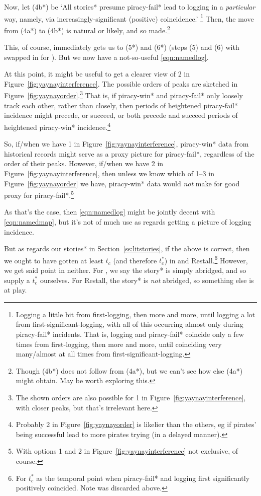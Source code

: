 		Now, let (4b*) be `All stories* presume piracy-fail* lead to logging in a \emph{particular} way, namely, via increasingly-significant (positive) coincidence.'%
		\footnote{Logging a little bit from first-logging, then more and more, until logging a lot from first-significant-logging, with all of this occurring almost only during piracy-fail* incidents. That is, logging and piracy-fail* coincide only a few times from first-logging, then more and more, until coinciding very many/almost at all times from first-significant-logging.}
		Then, the move from (4a*) to (4b*) is natural or likely, and so made.\footnote{Though (4b*) does not follow from (4a*), but we can't see how else (4a*) might obtain. May be worth exploring this.}
		
		This, of course, immediately gets us to (5*) and (6*) (steps (5) and (6) with  swapped in for ). But we now have a not-so-useful \ref{eqn:namedlog}.
		
		At this point, it might be useful to get a clearer view of 2 in Figure~\ref{fig:yaynayinterference}. The possible orders of peaks are sketched in Figure~\ref{fig:yaynayorder}.\footnote{The shown orders are also possible for 1 in Figure~\ref{fig:yaynayinterference}, with closer peaks, but that's irrelevant here.} That is, if piracy-win* and piracy-fail* only loosely track each other, rather than closely, then periods of heightened piracy-fail* incidence might precede, or succeed, or both precede and succeed periods of heightened piracy-win* incidence.\footnote{Probably 2 in Figure~\ref{fig:yaynayorder} is likelier than the others, eg if pirates' being successful lead to more pirates trying (in a delayed manner).}
		
		So, if/when we have 1 in Figure~\ref{fig:yaynayinterference}, piracy-win* data from historical records might serve as a proxy picture for piracy-fail*, regardless of the order of their peaks. However, if/when we have 2 in Figure~\ref{fig:yaynayinterference}, then unless we know which of 1--3 in Figure~\ref{fig:yaynayorder} we have, piracy-win* data would \emph{not} make for good proxy for piracy-fail*.\footnote{With options 1 and 2 in Figure~\ref{fig:yaynayinterference} not exclusive, of course.}
		
		As that's the case, then \ref{eqn:namedlog} might be jointly decent with \ref{eqn:namedmap}, but it's not of much use as regards getting a picture of logging incidence.
		
		But as regards our stories* in Section~\ref{ss:litstories}, if the above is correct, then we ought to have gotten at least \(t_c\) (and therefore \(t_c^*\)) in  and Restall.\footnote{For \(t_c^*\) as the temporal point when piracy-fail* and logging first significantly positively coincided. Note  was discarded above.} However, we get said point in neither. For , we say the story* is simply abridged, and so supply a \(t_c^*\) ourselves. For Restall, the story* is \emph{not} abridged, so something else is at play.
		
